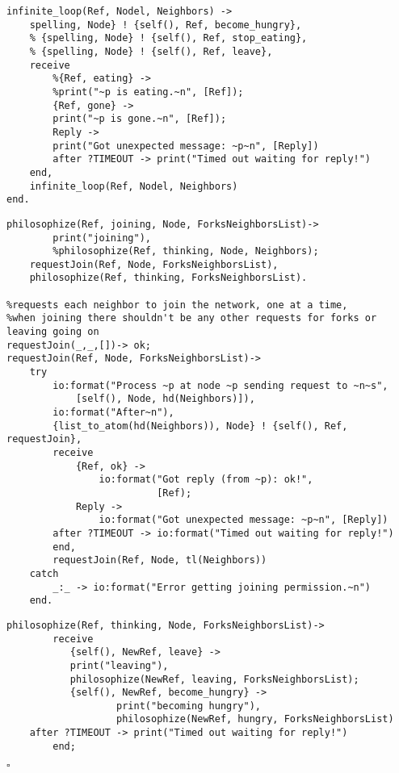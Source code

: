 \documentclass[11pt]{article}
\newenvironment{solution}{\noindent{\bf Solution.} }{

\hfill$\square$}
\begin{document}
\begin{solution}


\begin{lstlisting}
infinite_loop(Ref, Nodel, Neighbors) ->
    spelling, Node} ! {self(), Ref, become_hungry},
    % {spelling, Node} ! {self(), Ref, stop_eating},
    % {spelling, Node} ! {self(), Ref, leave},
    receive
        %{Ref, eating} ->          
        %print("~p is eating.~n", [Ref]);
        {Ref, gone} ->
        print("~p is gone.~n", [Ref]);
        Reply ->
        print("Got unexpected message: ~p~n", [Reply])
        after ?TIMEOUT -> print("Timed out waiting for reply!")
    end,
    infinite_loop(Ref, Nodel, Neighbors)
end.
\end{lstlisting}

\begin{lstlisting}
philosophize(Ref, joining, Node, ForksNeighborsList)->
        print("joining"),
        %philosophize(Ref, thinking, Node, Neighbors);
    requestJoin(Ref, Node, ForksNeighborsList),
    philosophize(Ref, thinking, ForksNeighborsList).
    
%requests each neighbor to join the network, one at a time,
%when joining there shouldn't be any other requests for forks or leaving going on
requestJoin(_,_,[])-> ok;
requestJoin(Ref, Node, ForksNeighborsList)->
    try
        io:format("Process ~p at node ~p sending request to ~n~s",
            [self(), Node, hd(Neighbors)]),
        io:format("After~n"),
        {list_to_atom(hd(Neighbors)), Node} ! {self(), Ref, requestJoin},
        receive
            {Ref, ok} ->
                io:format("Got reply (from ~p): ok!",
                          [Ref);
            Reply ->
                io:format("Got unexpected message: ~p~n", [Reply])
        after ?TIMEOUT -> io:format("Timed out waiting for reply!")
        end,
        requestJoin(Ref, Node, tl(Neighbors))
    catch
        _:_ -> io:format("Error getting joining permission.~n")
    end.
\end{lstlisting}

\begin{lstlisting}
philosophize(Ref, thinking, Node, ForksNeighborsList)->
        receive
           {self(), NewRef, leave} ->
           print("leaving"),
           philosophize(NewRef, leaving, ForksNeighborsList);
           {self(), NewRef, become_hungry} ->
                   print("becoming hungry"),
                   philosophize(NewRef, hungry, ForksNeighborsList)
	after ?TIMEOUT -> print("Timed out waiting for reply!")
        end;
\end{lstlisting}


\end{solution}
\end{document}
